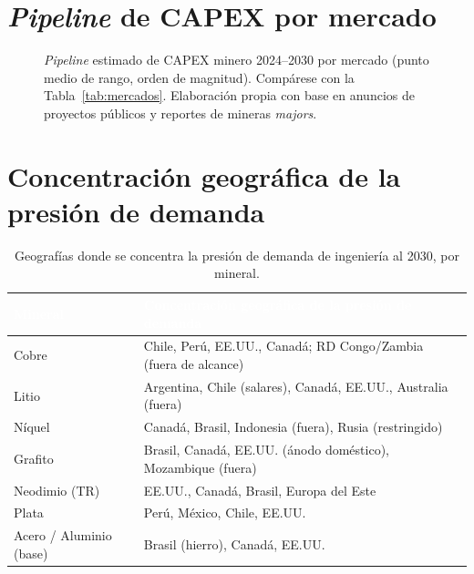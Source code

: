 \documentclass[11pt,letterpaper]{report}
\begin{document}
\section{\emph{Pipeline} de CAPEX por mercado}
\begin{figure}[htbp]
\centering
{}
\caption[Pipeline de CAPEX minero por mercado]{\emph{Pipeline} estimado de CAPEX minero 2024--2030 por mercado (punto medio de
rango, orden de magnitud). Compárese con la Tabla~\ref{tab:mercados}. Elaboración propia con base en anuncios de proyectos
públicos y reportes de mineras \emph{majors}.}
\label{fig:capex-pais}
\end{figure}

\section{Concentración geográfica de la presión de demanda}
\begin{table}[htbp]
\centering
\caption{Geografías donde se concentra la presión de demanda de ingeniería al 2030, por mineral.}
\label{tab:geo-mineral}
\footnotesize
\renewcommand{\arraystretch}{1.2}
\begin{tabularx}{\textwidth}{@{}lX@{}}
\toprule
\rowcolor{tablehead}\textcolor{white}{\textbf{Mineral}} & \textcolor{white}{\textbf{Concentración geográfica de la presión de demanda}}\\
\midrule
Cobre & Chile, Perú, EE.UU., Canadá; RD Congo/Zambia (fuera de alcance)\\
\rowcolor{tablealt}Litio & Argentina, Chile (salares), Canadá, EE.UU., Australia (fuera)\\
Níquel & Canadá, Brasil, Indonesia (fuera), Rusia (restringido)\\
\rowcolor{tablealt}Grafito & Brasil, Canadá, EE.UU. (ánodo doméstico), Mozambique (fuera)\\
Neodimio (TR) & EE.UU., Canadá, Brasil, Europa del Este\\
\rowcolor{tablealt}Plata & Perú, México, Chile, EE.UU.\\
Acero / Aluminio (base) & Brasil (hierro), Canadá, EE.UU.\\
\bottomrule
\end{tabularx}
\end{table}
\end{document}
